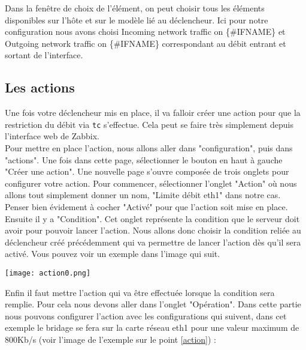 	Dans la fenêtre de choix de l'élément, on peut choisir tous les éléments disponibles sur l'hôte et sur le modèle lié au déclencheur. Ici pour notre configuration nous avons choisi Incoming network traffic on \{\#IFNAME\} et Outgoing network traffic on \{\#IFNAME\} correspondant au débit entrant et sortant de l'interface.\\

	\subsection{Les actions}
		\vspace{0.3cm}

		Une fois votre déclencheur mis en place, il va falloir créer une action pour que la restriction du débit via \verb?tc? s'effectue. Cela peut se faire très simplement depuis l'interface web de Zabbix.\\

	Pour mettre en place l'action, nous allons aller dans "configuration", puis dans "actions". Une fois dans cette page, sélectionner le bouton en haut à gauche "Créer une action". Une nouvelle page s'ouvre composée de trois onglets pour configurer votre action. Pour commencer, sélectionner l'onglet "Action" où nous allons tout simplement donner un nom, "Limite débit eth1" dans notre cas. Penser bien évidement à cocher "Activé" pour que l'action soit mise en place.\\

		Ensuite il y a "Condition". Cet onglet représente la condition que le serveur doit avoir pour pouvoir lancer l'action. Nous allons donc choisir la condition reliée au déclencheur créé précédemment qui va permettre de lancer l'action dès qu'il sera activé. Vous pouvez voir un exemple dans l'image qui suit.\\

		\begin{center}
			\texttt{[image: action0.png]}
		\vspace{1cm}	
		\end{center}
		
		Enfin il faut mettre l'action qui va être effectuée lorsque la condition sera remplie. Pour cela nous devons aller dans l'onglet "Opération". Dans cette partie nous pouvons configurer l'action avec les configurations qui suivent, dans cet exemple le bridage se fera sur la carte réseau eth1 pour une valeur maximum de 800Kb/s (voir l'image de l'exemple sur le point \ref{action}) :\\

